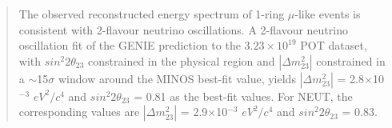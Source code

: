 \begin{frontmatter}
\begin{abstract}
The observed reconstructed energy spectrum of 1-ring $\mu$-like events is consistent
with 2-flavour neutrino oscillations.
A 2-flavour neutrino oscillation fit of the GENIE prediction to the $3.23 \times 10^{19}$ POT dataset, 
with $sin^{2}2\theta_{23}$ constrained in the physical region 
and $|\Delta m^{2}_{23}|$ constrained in a $\sim$15$\sigma$ window around the MINOS best-fit value,
yields 
$|\Delta m^{2}_{23}|$ = 2.8$\times$10$^{-3}$ $eV^{2}/c^{4}$ and
$sin^{2}2\theta_{23}$ = 0.81
as the best-fit values.
For NEUT, the corresponding values are 
$|\Delta m^{2}_{23}|$ = 2.9$\times$10$^{-3}$ $eV^{2}/c^{4}$ and
$sin^{2}2\theta_{23}$ = 0.83.

\end{abstract}

%
%


\end{frontmatter}

\clearpage

\tableofcontents

\clearpage

\listoffigures
\listoftables


